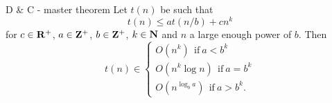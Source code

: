 \documentclass{beamer}
\begin{document}
%

\begin{frame}{D \& C - master theorem}
	Let $t(n)$ be such that
	\[
		t(n) \leq at(n/b) + cn^k
	\]
	for $c \in \mathbf{R}^+$, $a \in \mathbf{Z}^+$, $b \in \mathbf{Z}^+$, $k \in \mathbf{N}$ and $n$ a
	large enough power of $b$. Then
	\[
		t(n) \in
		\begin{cases}
			O(n^k)\ \ \text{if}\ a < b^k\\
			O(n^k\log n)\ \ \text{if}\ a = b^k\\
			O(n^{\log_b a})\ \ \text{if}\ a > b^k.
		\end{cases}
	\]
\end{frame}
\end{document}
